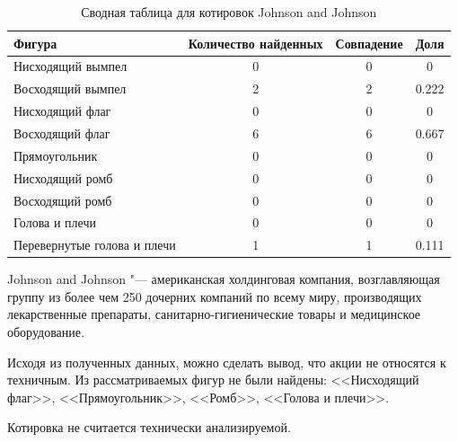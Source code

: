 \documentclass[bachelor, och, coursework]{SCWorks}
\begin{document}
    \begin{table}[!hbt]
        \centering
        \begin{tabular}{|l|c|c|c|}
        \hline
        Фигура                      & \multicolumn{1}{l|}{Количество найденных} & Совпадение & Доля  \\ \hline
        Нисходящий вымпел           & 0                                         & 0          & 0     \\ \hline
        Восходящий вымпел           & 2                                         & 2          & 0.222 \\ \hline
        Нисходящий флаг             & 0                                         & 0          & 0     \\ \hline
        Восходящий флаг             & 6                                         & 6          & 0.667 \\ \hline
        Прямоугольник               & 0                                         & 0          & 0     \\ \hline
        Нисходящий ромб             & 0                                         & 0          & 0     \\ \hline
        Восходящий ромб             & 0                                         & 0          & 0     \\ \hline
        Голова и плечи              & 0                                         & 0          & 0     \\ \hline
        Перевернутые голова и плечи & 1                                         & 1          & 0.111 \\ \hline
        \end{tabular}
        \captionsetup{justification=centering}
        \caption{Сводная таблица для котировок Johnson and Johnson}    
    \end{table}

    
        Johnson and Johnson "--- американская холдинговая компания, возглавляющая
        группу из более чем 250 дочерних компаний по всему миру, производящих
        лекарственные препараты, санитарно-гигиенические товары и медицинское
        оборудование.
    
        Исходя из полученных данных, можно сделать вывод, что акции не относятся
        к техничным. Из рассматриваемых фигур не были найдены: <<Нисходящий 
        флаг>>, <<Прямоугольник>>, <<Ромб>>, <<Голова и плечи>>.

        Котировка не считается технически анализируемой.
\end{document}
